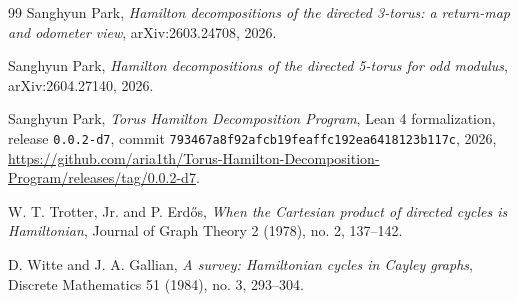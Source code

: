 \documentclass[11pt]{article}
\theoremstyle{definition}
\begin{document}
\begin{thebibliography}{99}
Sanghyun Park,
\emph{Hamilton decompositions of the directed 3-torus: a return-map and odometer view},
arXiv:2603.24708, 2026.

Sanghyun Park,
\emph{Hamilton decompositions of the directed 5-torus for odd modulus}, arXiv:2604.27140, 2026.

Sanghyun Park,
\emph{Torus Hamilton Decomposition Program}, Lean 4 formalization, release \texttt{0.0.2-d7},
commit \texttt{793467a8f92afcb19feaffc192ea6418123b117c}, 2026,
\url{https://github.com/aria1th/Torus-Hamilton-Decomposition-Program/releases/tag/0.0.2-d7}.

W. T. Trotter, Jr. and P. Erd\H{o}s,
\emph{When the Cartesian product of directed cycles is Hamiltonian},
Journal of Graph Theory 2 (1978), no. 2, 137--142.

D. Witte and J. A. Gallian,
\emph{A survey: Hamiltonian cycles in Cayley graphs},
Discrete Mathematics 51 (1984), no. 3, 293--304.

\end{thebibliography}
\end{document}
